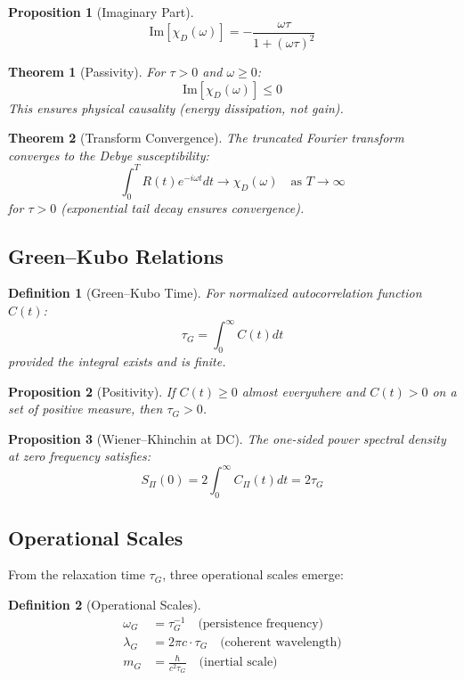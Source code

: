 \documentclass[11pt]{article}
\newtheorem{theorem}{Theorem}
\newtheorem{definition}{Definition}
\newtheorem{proposition}{Proposition}
\begin{document}
\begin{proposition}[Imaginary Part]
\[
\text{Im}[\chi_D(\omega)] = -\frac{\omega\tau}{1 + (\omega\tau)^2}
\]
\end{proposition}

\begin{theorem}[Passivity]
For $\tau > 0$ and $\omega \geq 0$:
\[
\text{Im}[\chi_D(\omega)] \leq 0
\]
This ensures physical causality (energy dissipation, not gain).
\end{theorem}

\begin{theorem}[Transform Convergence]
The truncated Fourier transform converges to the Debye susceptibility:
\[
\int_0^T R(t) e^{-i\omega t} dt \to \chi_D(\omega) \quad \text{as } T \to \infty
\]
for $\tau > 0$ (exponential tail decay ensures convergence).
\end{theorem}

\subsection{Green--Kubo Relations}

\begin{definition}[Green--Kubo Time]
For normalized autocorrelation function $C(t)$:
\[
\tau_G = \int_0^\infty C(t) dt
\]
provided the integral exists and is finite.
\end{definition}

\begin{proposition}[Positivity]
If $C(t) \geq 0$ almost everywhere and $C(t) > 0$ on a set of positive measure, then $\tau_G > 0$.
\end{proposition}

\begin{proposition}[Wiener--Khinchin at DC]
The one-sided power spectral density at zero frequency satisfies:
\[
S_\Pi(0) = 2 \int_0^\infty C_\Pi(t) dt = 2\tau_G
\]
\end{proposition}

\subsection{Operational Scales}

From the relaxation time $\tau_G$, three operational scales emerge:

\begin{definition}[Operational Scales]
\begin{align}
\omega_G &= \tau_G^{-1} \quad \text{(persistence frequency)} \\
\lambda_G &= 2\pi c \cdot \tau_G \quad \text{(coherent wavelength)} \\
m_G &= \frac{\hbar}{c^2 \tau_G} \quad \text{(inertial scale)}
\end{align}
\end{definition}
\end{document}
